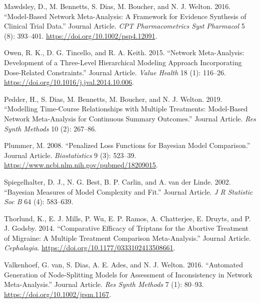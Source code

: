 \documentclass[]{article}
\begin{document}
\leavevmode\hypertarget{ref-mawdsley2016}{}%
Mawdsley, D., M. Bennetts, S. Dias, M. Boucher, and N. J. Welton. 2016.
``Model-Based Network Meta-Analysis: A Framework for Evidence Synthesis
of Clinical Trial Data.'' Journal Article. \emph{CPT Pharmacometrics
Syst Pharmacol} 5 (8): 393--401.
\url{https://doi.org/10.1002/psp4.12091}.

\leavevmode\hypertarget{ref-owen2015}{}%
Owen, R. K., D. G. Tincello, and R. A. Keith. 2015. ``Network
Meta-Analysis: Development of a Three-Level Hierarchical Modeling
Approach Incorporating Dose-Related Constraints.'' Journal Article.
\emph{Value Health} 18 (1): 116--26.
\url{https://doi.org/10.1016/j.jval.2014.10.006}.

\leavevmode\hypertarget{ref-pedder2019}{}%
Pedder, H., S. Dias, M. Bennetts, M. Boucher, and N. J. Welton. 2019.
``Modelling Time-Course Relationships with Multiple Treatments:
Model-Based Network Meta-Analysis for Continuous Summary Outcomes.''
Journal Article. \emph{Res Synth Methods} 10 (2): 267--86.

\leavevmode\hypertarget{ref-plummer2008}{}%
Plummer, M. 2008. ``Penalized Loss Functions for Bayesian Model
Comparison.'' Journal Article. \emph{Biostatistics} 9 (3): 523--39.
\url{https://www.ncbi.nlm.nih.gov/pubmed/18209015}.

\leavevmode\hypertarget{ref-spiegelhalter2002}{}%
Spiegelhalter, D. J., N. G. Best, B. P. Carlin, and A. van der Linde.
2002. ``Bayesian Measures of Model Complexity and Fit.'' Journal
Article. \emph{J R Statistic Soc B} 64 (4): 583--639.

\leavevmode\hypertarget{ref-thorlund2014}{}%
Thorlund, K., E. J. Mills, P. Wu, E. P. Ramos, A. Chatterjee, E. Druyts,
and P. J. Godsby. 2014. ``Comparative Efficacy of Triptans for the
Abortive Treatment of Migraine: A Multiple Treatment Comparison
Meta-Analysis.'' Journal Article. \emph{Cephalagia}.
\url{https://doi.org/10.1177/0333102413508661}.

\leavevmode\hypertarget{ref-vanvalkenhoef2016}{}%
Valkenhoef, G. van, S. Dias, A. E. Ades, and N. J. Welton. 2016.
``Automated Generation of Node-Splitting Models for Assessment of
Inconsistency in Network Meta-Analysis.'' Journal Article. \emph{Res
Synth Methods} 7 (1): 80--93. \url{https://doi.org/10.1002/jrsm.1167}.
\end{document}
